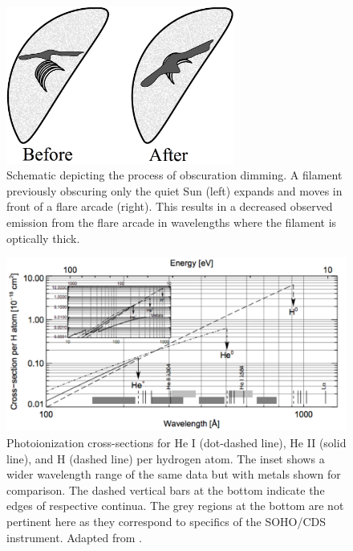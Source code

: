 \begin{figure}[!h]
    \caption[Schematic of obscuration dimming]{
        Schematic depicting the process of obscuration dimming. A filament previously obscuring only the quiet Sun (left)
        expands and moves in front of a flare arcade (right). This results in a decreased observed emission from the flare
        arcade in wavelengths where the filament is optically thick.
    }
    \begin{center}
        \includegraphics[width=75mm]{Images/ObscurationDimming.png}
    \end{center}
    \label{obscurationDimming}
\end{figure}

\begin{figure}[!h]
    \caption[Photoionization cross-sections for H and He]{
        Photoionization cross-sections for He I (dot-dashed line), He II (solid line), and H (dashed line) per hydrogen
        atom. The inset shows a wider wavelength range of the same data but with metals shown for comparison. The dashed
        vertical bars at the bottom indicate the edges of respective continua. The grey regions at the bottom are not 
        pertinent here as they correspond to specifics of the SOHO/CDS instrument. Adapted from \citet{Andretta2003}. 
    }
    \begin{center}
        \includegraphics[width=150mm]{Images/PhotoionizationCrossSection.png}
    \end{center}
    \label{photoionizationCrossSection}
\end{figure}

